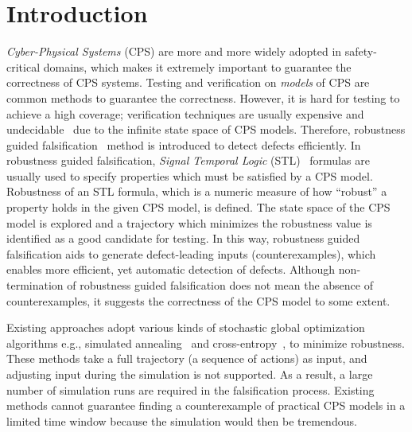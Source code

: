 \section{Introduction}\label{sec:introduction}

\emph{Cyber-Physical Systems} (CPS) are more and more widely adopted in safety-critical domains, which makes it extremely important to guarantee the correctness of CPS systems.
Testing and verification on \emph{models} of CPS are common methods to guarantee the correctness.
However, it is hard for testing to achieve a high coverage; verification techniques are usually expensive and  undecidable~\cite{DBLP:conf/allerton/AbbasF12} due to the infinite state space
of CPS models.
Therefore, robustness guided falsification~\cite{TLF_CPS_2013,DBLP:conf/tacas/AnnpureddyLFS11} method is introduced to detect defects efficiently.
In robustness guided falsification, \emph{Signal Temporal Logic} (STL)~\cite{bartocci2018specification} formulas are usually used to specify properties which must be satisfied by a CPS model.
Robustness of an STL formula, which is a numeric measure of how ``robust'' a property holds in the given CPS model, is defined.
The state space of the CPS model is explored and a trajectory which minimizes the robustness value is identified as a good candidate for testing.
In this way, robustness guided falsification aids to generate defect-leading inputs (counterexamples), which enables more efficient, yet automatic detection of defects.
Although non-termination of robustness guided falsification does not mean the absence of counterexamples, it suggests the correctness of the CPS model to some extent.

Existing approaches adopt various kinds of stochastic global optimization algorithms e.g., simulated annealing~\cite{DBLP:conf/allerton/AbbasF12} and cross-entropy~\cite{DBLP:conf/hybrid/SankaranarayananF12}, to minimize robustness.
These methods take a full trajectory (a sequence of actions) as input, and adjusting input during the simulation is not supported. As a result, a large number of simulation runs are required in the falsification process.
Existing methods cannot guarantee finding a counterexample of practical CPS models in a limited time window because the simulation would then be tremendous.

